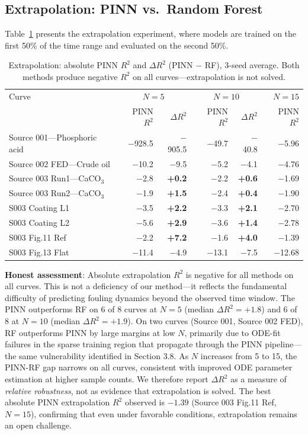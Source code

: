 \documentclass[review]{elsarticle}
\begin{document}
\subsection{Extrapolation: PINN vs.\ Random Forest}

Table~\ref{tab:extrap} presents the extrapolation experiment, where models are trained on the first 50\% of the time range and evaluated on the second 50\%.

\begin{table}[htbp]
\centering
\caption{Extrapolation: absolute PINN $R^2$ and $\Delta R^2$ (PINN $-$ RF), 3-seed average. Both methods produce negative $R^2$ on all curves---extrapolation is not solved.}
\label{tab:extrap}
\begin{tabular}{@{}p{3.5cm}rrrrr@{}}
\toprule
Curve & \multicolumn{2}{c}{$N=5$} & \multicolumn{2}{c}{$N=10$} & $N=15$ \\
 & PINN $R^2$ & $\Delta R^2$ & PINN $R^2$ & $\Delta R^2$ & PINN $R^2$ \\
\midrule
Source 001---Phosphoric acid & $-$928.5 & $-$905.5 & $-$49.7 & $-$40.8 & $-$5.96 \\
Source 002 FED---Crude oil & $-$10.2 & $-$9.5 & $-$5.2 & $-$4.1 & $-$4.76 \\
Source 003 Run1---CaCO$_3$ & $-$2.8 & \textbf{+0.2} & $-$2.2 & \textbf{+0.6} & $-$1.69 \\
Source 003 Run2---CaCO$_3$ & $-$1.9 & \textbf{+1.5} & $-$2.4 & \textbf{+0.4} & $-$1.90 \\
S003 Coating L1 & $-$3.5 & \textbf{+2.2} & $-$3.3 & \textbf{+2.1} & $-$2.70 \\
S003 Coating L2 & $-$5.6 & \textbf{+2.9} & $-$3.6 & \textbf{+1.4} & $-$2.78 \\
S003 Fig.11 Ref & $-$2.2 & \textbf{+7.2} & $-$1.6 & \textbf{+4.0} & $-$1.39 \\
S003 Fig.13 Flat & $-$11.4 & $-$4.9 & $-$13.1 & $-$7.5 & $-$12.68 \\
\bottomrule
\end{tabular}
\end{table}

\textbf{Honest assessment}: Absolute extrapolation $R^2$ is negative for all methods on all curves. This is not a deficiency of our method---it reflects the fundamental difficulty of predicting fouling dynamics beyond the observed time window. The PINN outperforms RF on 6 of 8 curves at $N=5$ (median $\Delta R^2 = +1.8$) and 6 of 8 at $N=10$ (median $\Delta R^2 = +1.9$). On two curves (Source 001, Source 002 FED), RF outperforms PINN by large margins at low $N$, primarily due to ODE-fit failures in the sparse training region that propagate through the PINN pipeline---the same vulnerability identified in Section 3.8. As $N$ increases from 5 to 15, the PINN-RF gap narrows on all curves, consistent with improved ODE parameter estimation at higher sample counts. We therefore report $\Delta R^2$ as a measure of \textit{relative robustness}, not as evidence that extrapolation is solved. The best absolute PINN extrapolation $R^2$ observed is $-1.39$ (Source 003 Fig.11 Ref, $N=15$), confirming that even under favorable conditions, extrapolation remains an open challenge.
\end{document}
